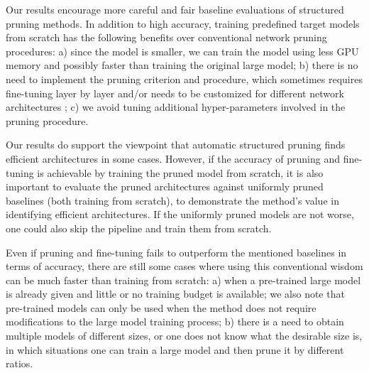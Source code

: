 Our results encourage more careful and fair baseline evaluations of structured pruning methods. In addition to high accuracy, training predefined target models from scratch has the following benefits over conventional network pruning procedures:
a) since the model is smaller, we can train the model using less GPU memory and possibly faster than training the original large model;
b) there is no need to implement the pruning criterion and procedure, which sometimes  requires fine-tuning layer by layer \citep{luo2017thinet} and/or needs to be customized for different network architectures \citep{li2016pruning, liu2017learning};
c) we avoid tuning additional hyper-parameters involved in the pruning procedure.

 Our results do support the viewpoint that  automatic structured pruning finds efficient architectures in some cases. However, if the accuracy of pruning and fine-tuning is achievable by training the pruned model from scratch, it is also important to evaluate the pruned architectures against uniformly pruned baselines (both training from scratch), to demonstrate the method's value in identifying efficient architectures. If the uniformly pruned models are not worse, one could also skip the pipeline and train them from scratch.

 Even if pruning and fine-tuning fails to outperform the mentioned baselines in terms of accuracy, there are still some cases where using this conventional wisdom can be much faster than training from scratch:
a) when a pre-trained large model is already given and little or no training budget is available; we also note that pre-trained models can only be used when the method does not require modifications to the large model training process;
b) there is a need to obtain multiple models of different sizes, or one does not know what the desirable size is, in which situations one can train a large model and then prune it by different ratios.

